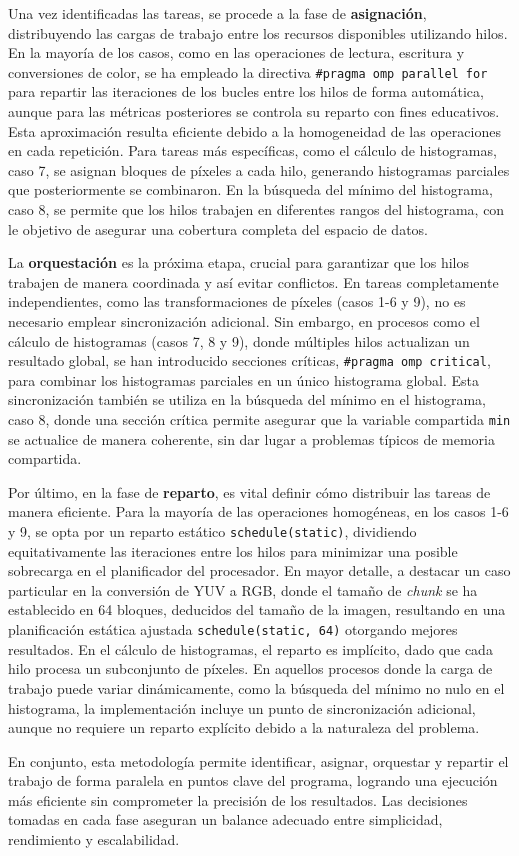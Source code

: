 Una vez identificadas las tareas, se procede a la fase de \textbf{asignación}, distribuyendo las cargas de trabajo entre los recursos disponibles utilizando hilos. En la mayoría de los casos, como en las operaciones de lectura, escritura y conversiones de color, se ha empleado la directiva \texttt{\#pragma omp parallel for} para repartir las iteraciones de los bucles entre los hilos de forma automática, aunque para las métricas posteriores se controla su reparto con fines educativos. Esta aproximación resulta eficiente debido a la homogeneidad de las operaciones en cada repetición. Para tareas más específicas, como el cálculo de histogramas, caso 7, se asignan bloques de píxeles a cada hilo, generando histogramas parciales que posteriormente se combinaron. En la búsqueda del mínimo del histograma, caso 8, se permite que los hilos trabajen en diferentes rangos del histograma, con le objetivo de asegurar una cobertura completa del espacio de datos.

La \textbf{orquestación} es la próxima etapa, crucial para garantizar que los hilos trabajen de manera coordinada y así evitar conflictos. En tareas completamente independientes, como las transformaciones de píxeles (casos 1-6 y 9), no es necesario emplear sincronización adicional. Sin embargo, en procesos como el cálculo de histogramas (casos 7, 8 y 9), donde múltiples hilos actualizan un resultado global, se han introducido secciones críticas, \texttt{\#pragma omp critical}, para combinar los histogramas parciales en un único histograma global. Esta sincronización también se utiliza en la búsqueda del mínimo en el histograma, caso 8, donde una sección crítica permite asegurar que la variable compartida \texttt{min} se actualice de manera coherente, sin dar lugar a problemas típicos de memoria compartida.

Por último, en la fase de \textbf{reparto}, es vital definir cómo distribuir las tareas de manera eficiente. Para la mayoría de las operaciones homogéneas, en los casos 1-6 y 9, se opta por un reparto estático \texttt{schedule(static)}, dividiendo equitativamente las iteraciones entre los hilos para minimizar una posible sobrecarga en el planificador del procesador. En mayor detalle, a destacar un caso particular en la conversión de YUV a RGB, donde el tamaño de \textit{chunk} se ha establecido en 64 bloques, deducidos del tamaño de la imagen, resultando en una planificación estática ajustada \texttt{schedule(static, 64)} otorgando mejores resultados. 
En el cálculo de histogramas, el reparto es implícito, dado que cada hilo procesa un subconjunto de píxeles. En aquellos procesos donde la carga de trabajo puede variar dinámicamente, como la búsqueda del mínimo no nulo en el histograma, la implementación incluye un punto de sincronización adicional, aunque no requiere un reparto explícito debido a la naturaleza del problema.

En conjunto, esta metodología permite identificar, asignar, orquestar y repartir el trabajo de forma paralela en puntos clave del programa, logrando una ejecución más eficiente sin comprometer la precisión de los resultados. Las decisiones tomadas en cada fase aseguran un balance adecuado entre simplicidad, rendimiento y escalabilidad.